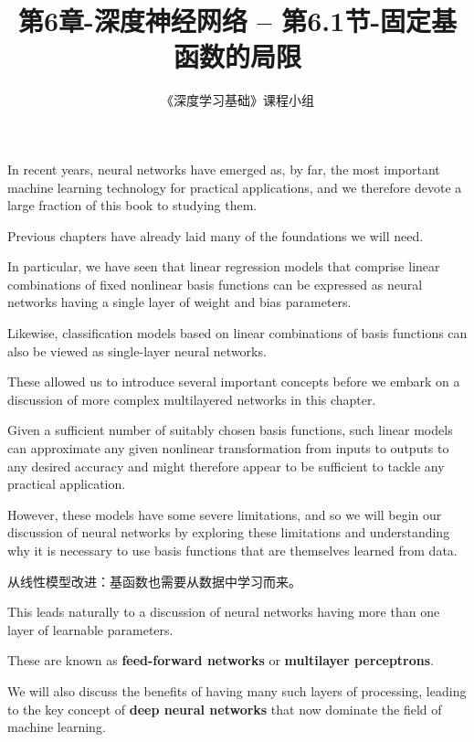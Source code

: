 \documentclass{article}
\title{第6章-深度神经网络 -- 第6.1节-固定基函数的局限}
\author{《深度学习基础》课程小组}
\begin{document}
\maketitle
\tableofcontents


In recent years, neural networks have emerged as, by far, the most important machine learning technology for practical applications, and we therefore devote a large fraction of this book to studying them. 

Previous chapters have already laid many of the foundations we will need. 

In particular, we have seen that linear regression models that comprise linear combinations of fixed nonlinear basis functions can be expressed as neural networks having a single layer of weight and bias parameters. 

Likewise, classification models based on linear combinations of basis functions can also be viewed as single-layer neural networks. 

These allowed us to introduce several important concepts before we embark on a discussion of more complex multilayered networks in this chapter.

Given a sufficient number of suitably chosen basis functions, such linear models can approximate any given nonlinear transformation from inputs to outputs to any desired accuracy and might therefore appear to be sufficient to tackle any practical application. 

However, these models have some severe limitations, and so we will begin our discussion of neural networks by exploring these limitations and understanding why it is necessary to use basis functions that are themselves learned from data. 

{\color{red}
从线性模型改进：基函数也需要从数据中学习而来。
}

This leads naturally to a discussion of neural networks having more than one layer of learnable parameters. 

These are known as \textbf{feed-forward networks} or \textbf{multilayer perceptrons}. 

We will also discuss the benefits of having many such layers of processing, leading to the key concept of \textbf{deep neural networks} that now dominate the field of machine learning.
\end{document}
